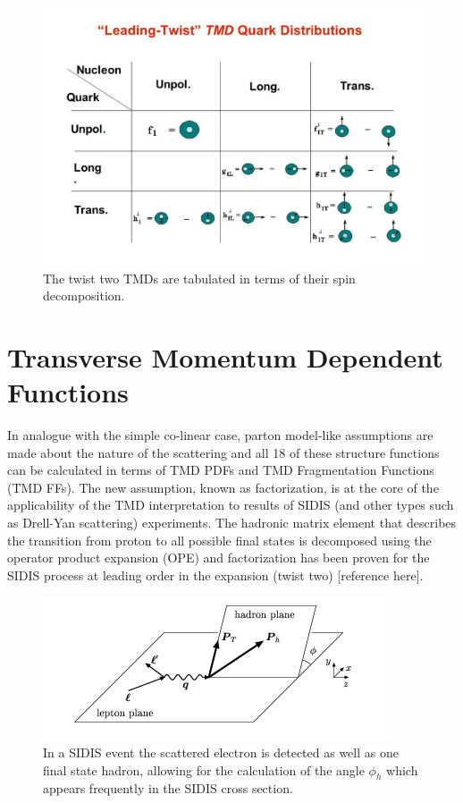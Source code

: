 \begin{figure}
	\centering
	\label{fig:tmd-table}
	\includegraphics[width = \textwidth]{image/diagrams/tmd-table.jpg}	
	\caption[Leading order TMD table.]{The twist two TMDs are tabulated in terms of their spin decomposition.}
\end{figure}

\section{Transverse Momentum Dependent Functions}
In analogue with the simple co-linear case, parton model-like assumptions are made about the nature of the scattering and all 18 of these structure functions can be calculated in terms of TMD PDFs and TMD Fragmentation Functions (TMD FFs).  The new assumption, known as factorization, is at the core of the applicability of the TMD interpretation to results of SIDIS (and other types such as Drell-Yan scattering) experiments.  The hadronic matrix element that describes the transition from proton to all possible final states is decomposed using the operator product expansion (OPE) and factorization has been proven for the SIDIS process at leading order in the expansion (twist two) [reference here].

\begin{figure}
	\centering
	\label{fig:sidis}
	\includegraphics[width = \textwidth]{image/diagrams/phi-hadron.png}	
	\caption[Diagrammatic representation of SIDIS with hadronic $\phi_h$ angle.]{In a SIDIS event the scattered electron is detected as well as one final state hadron, allowing for the calculation of the angle $\phi_h$ which appears frequently in the SIDIS cross section.}
\end{figure}


